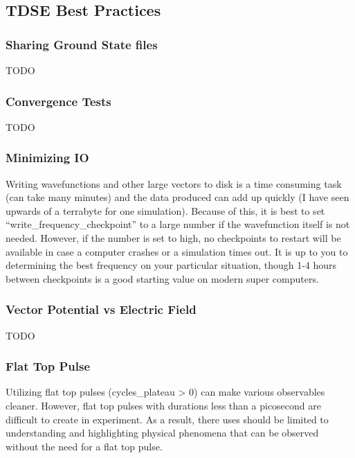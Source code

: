\documentclass{article}
\begin{document}

\subsection{TDSE Best Practices} %
\label{sub:tdse_best_practices}

\subsubsection{Sharing Ground State files} %
\label{ssub:sharing_ground_state_files}
TODO

\subsubsection{Convergence Tests} %
\label{ssub:convergence_tests}
TODO

\subsubsection{Minimizing IO} %
\label{ssub:minimizing_io}
Writing wavefunctions and other large vectors to disk is a time consuming task (can take many minutes) and the data produced can add up quickly (I have seen upwards of a terrabyte for one simulation). Because of this, it is best to set ``write\_frequency\_checkpoint'' to a large number if the wavefunction itself is not needed. However, if the number is set to high, no checkpoints to restart will be available in case a computer crashes or a simulation times out. It is up to you to determining the best frequency on your particular situation, though 1-4 hours between checkpoints is a good starting value on modern super computers.

\subsubsection{Vector Potential vs Electric Field} %
\label{ssub:vector_potential_vs_electric_field}
TODO

\subsubsection{Flat Top Pulse} %
\label{ssub:flat_top_pulse}
Utilizing flat top pulses (cycles\_plateau > 0) can make various observables cleaner. However, flat top pulses with durations less than a picosecond are difficult to create in experiment. As a result, there uses should be limited to understanding and highlighting physical phenomena that can be observed without the need for a flat top pulse.
\end{document}
